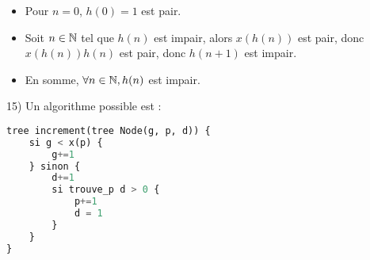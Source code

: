 \documentclass{article}
\begin{document}
\begin{itemize}
    \item Pour $n=0$, $h(0)=1$ est pair.
    
    \item Soit $n\in\mathbb{N}$ tel que $h(n)$ est impair, alors $x(h(n))$ est pair, donc $x(h(n))h(n)$ est pair, donc $h(n+1)$ est impair.
    
    \item En somme, $\forall n\in\mathbb{N}, h(n)$ est impair.
\end{itemize}

\bigskip
\bigskip

15) Un algorithme possible est :

\begin{lstlisting}[language=Python]
tree increment(tree Node(g, p, d)) {
    si g < x(p) {
        g+=1
    } sinon {
        d+=1
        si trouve_p d > 0 {
            p+=1
            d = 1
        }
    }
}
\end{lstlisting}
\end{document}
